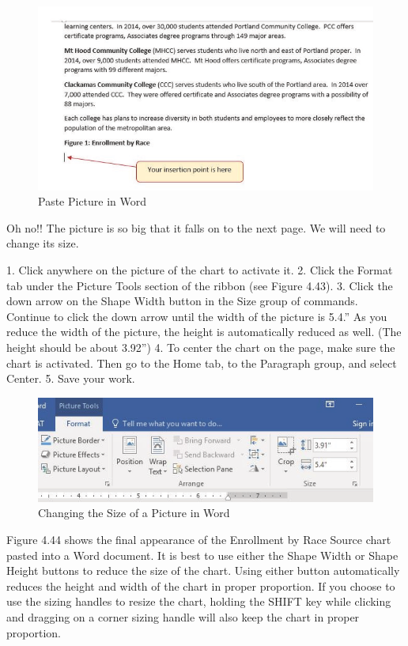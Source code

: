 \begin{figure}[H]
	\centering
	\includegraphics[width=\maxwidth{.95\linewidth}]{gfx/ch04_fig43}
	\caption{Paste Picture in Word}
	\label{04:fig43}
\end{figure}


Oh no!! The picture is so big that it falls on to the next page. We will need to change its size.

1. Click anywhere on the picture of the chart to activate it.
2. Click the Format tab under the Picture Tools section of the ribbon (see Figure 4.43).
3. Click the down arrow on the Shape Width button in the Size group of commands. Continue to
click the down arrow until the width of the picture is 5.4.” As you reduce the width of the
picture, the height is automatically reduced as well. (The height should be about 3.92'')
4. To center the chart on the page, make sure the chart is activated. Then go to the Home tab, to
the Paragraph group, and select Center.
5. Save your work.


\begin{figure}[H]
	\centering
	\includegraphics[width=\maxwidth{.95\linewidth}]{gfx/ch04_fig44}
	\caption{Changing the Size of a Picture in Word}
	\label{04:fig44}
\end{figure}


Figure 4.44 shows the final appearance of the Enrollment by Race Source chart pasted into a Word
document. It is best to use either the Shape Width or Shape Height buttons to reduce the size of
the chart. Using either button automatically reduces the height and width of the chart in proper
proportion. If you choose to use the sizing handles to resize the chart, holding the SHIFT key while
clicking and dragging on a corner sizing handle will also keep the chart in proper proportion.


